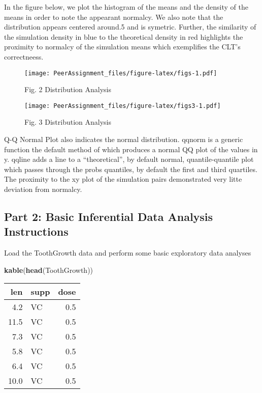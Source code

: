 \documentclass[]{article}
\newenvironment{Shaded}{\begin{snugshade}}{\end{snugshade}}
\newcommand{\KeywordTok}[1]{\textcolor[rgb]{0.13,0.29,0.53}{\textbf{#1}}}
\newcommand{\NormalTok}[1]{#1}
\begin{document}
In the figure below, we plot the histogram of the means and the density
of the means in order to note the appearant normalcy. We also note that
the distribution appears centered around.5 and is symetric. Further, the
similarity of the simulation density in blue to the theoretical density
in red highlights the proximity to normalcy of the simulation means
which exemplifies the CLT's correctneess.

\begin{figure}
\centering
\texttt{[image: PeerAssignment\_files/figure-latex/figs-1.pdf]}
\caption{Fig. 2 Distribution Analysis}
\end{figure}

\begin{figure}
\centering
\texttt{[image: PeerAssignment\_files/figure-latex/figs3-1.pdf]}
\caption{Fig. 3 Distribution Analysis}
\end{figure}

Q-Q Normal Plot also indicates the normal distribution. qqnorm is a
generic function the default method of which produces a normal QQ plot
of the values in y. qqline adds a line to a ``theoretical'', by default
normal, quantile-quantile plot which passes through the probs quantiles,
by default the first and third quartiles. The proximity to the xy plot
of the simulation pairs demonstrated very litte deviation from normalcy.

\hypertarget{part-2-basic-inferential-data-analysis-instructions}{%
\subsection{Part 2: Basic Inferential Data Analysis
Instructions}\label{part-2-basic-inferential-data-analysis-instructions}}

Load the ToothGrowth data and perform some basic exploratory data
analyses

\begin{Shaded}
\begin{Highlighting}[]
\KeywordTok{kable}\NormalTok{(}\KeywordTok{head}\NormalTok{(ToothGrowth))}
\end{Highlighting}
\end{Shaded}

\begin{longtable}[]{@{}rlr@{}}
\toprule
len & supp & dose\tabularnewline
\midrule
\endhead
4.2 & VC & 0.5\tabularnewline
11.5 & VC & 0.5\tabularnewline
7.3 & VC & 0.5\tabularnewline
5.8 & VC & 0.5\tabularnewline
6.4 & VC & 0.5\tabularnewline
10.0 & VC & 0.5\tabularnewline
\bottomrule
\end{longtable}
\end{document}
